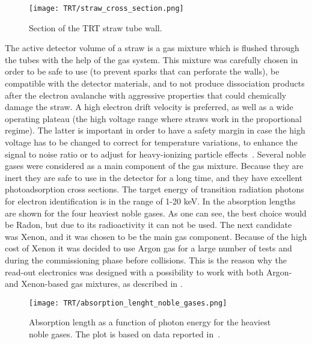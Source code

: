 \begin{figure}[h]
\centering
\texttt{[image: TRT/straw\_cross\_section.png]}
\caption{ 
Section of the TRT straw tube wall.
}
\label{fig:straw_wall_section}
\end{figure}

The active detector volume of a straw is a gas mixture which is flushed through the tubes with the help of the gas system.
This mixture was carefully chosen in order to be safe to use (to prevent sparks that can perforate the walls), be compatible with the detector materials, and to not produce dissociation products after the electron avalanche with aggressive properties that could chemically damage the straw.
A high electron drift velocity is preferred, as well as a wide operating plateau (the high voltage range where straws work in the proportional regime). 
The latter is important in order to have a
safety margin in case the high voltage has to be changed to correct for temperature variations, to enhance the signal to noise ratio 
or to adjust for 
heavy-ionizing particle effects~\cite{Abat:2008zza}.
Several noble gases were considered as a main component of the gas mixture. Because they are inert they are safe to use in the detector for a long time, and they have 
excellent photoadsorption cross sections.
The target energy of transition radiation photons for electron identification is in the range of 1-20 keV.
In  the absorption lengths are shown for the four heaviest noble gases.
As one can see, the best choice would be Radon, but due to its radioactivity it can not be used.
The next candidate was Xenon, and it was chosen to be the main gas component.
Because of the high cost of Xenon it was decided to use Argon gas for a large number of tests and during the commissioning phase before \pp collisions. This is the reason why the read-out electronics was
designed with a possibility to work with both Argon- and Xenon-based gas mixtures, as described in .

\begin{figure}[h]
\centering
\texttt{[image: TRT/absorption\_lenght\_noble\_gases.png]}
\caption{ 
  Absorption length as a function of photon energy for the heaviest noble gases. The plot is based on data reported in~\cite{Hubbell:353989}.
}
\label{fig:absorption_lenght}
\end{figure}

